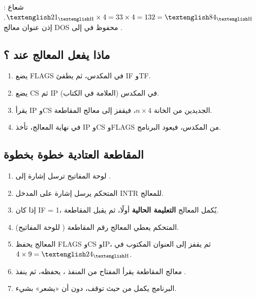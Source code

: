\begin{mithal}
    شعاع : $\hex{21} \times 4 = 33 \times 4 = 132 = \hex{84}$. إذن عنوان معالج \textenglish{DOS}
    محفوظ في  إلى .
\end{mithal}

\subsection{ماذا يفعل المعالج عند ؟}
\begin{enumerate}
    \item يضع \textenglish{FLAGS} في المكدس، ثم يطفئ \textenglish{IF} و\textenglish{TF}.
    \item يضع \textenglish{CS} ثم \textenglish{IP} في المكدس (العلامة في الكتاب).
    \item يقرأ \textenglish{IP} و\textenglish{CS} الجديدين من الخانة $n \times 4$، فيقفز إلى معالج المقاطعة.
    \item في نهاية المعالج،  تأخذ \textenglish{IP} و\textenglish{CS} و\textenglish{FLAGS} من المكدس، فيعود البرنامج.
\end{enumerate}

\subsection{المقاطعة العتادية خطوة بخطوة}
\begin{khatwa}
    \begin{enumerate}
        \item لوحة المفاتيح ترسل إشارة إلى .
        \item المتحكم يرسل إشارة على المدخل \textenglish{INTR} للمعالج.
        \item إذا كان \textenglish{IF = 1}، يُكمل المعالج \textbf{التعليمة الحالية} أولًا، ثم يقبل المقاطعة.
        \item المتحكم يعطي المعالج رقم المقاطعة ( للوحة المفاتيح).
        \item المعالج يحفظ \textenglish{FLAGS} و\textenglish{CS} و\textenglish{IP}، ثم يقفز إلى العنوان المكتوب في $4 \times 9 = \hex{24}$.
        \item معالج المقاطعة يقرأ المفتاح من المنفذ ، يحفظه، ثم ينفذ .
        \item البرنامج يكمل من حيث توقف، دون أن «يشعر» بشيء.
    \end{enumerate}
\end{khatwa}

